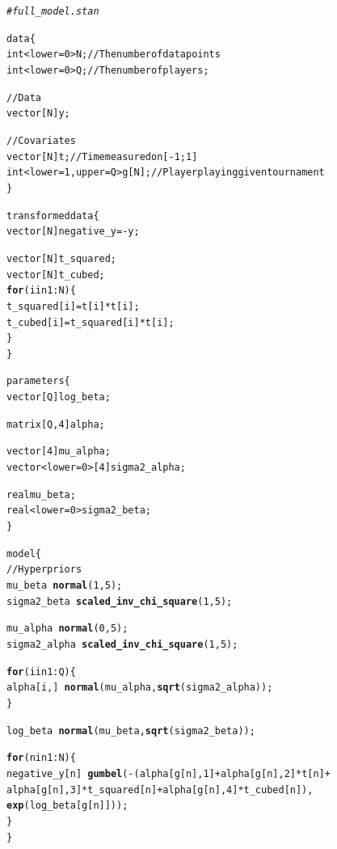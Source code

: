 \documentclass{article}\usepackage[]{graphicx}\usepackage[]{color}
\makeatletter
\newcommand{\hlcom}[1]{\textcolor[rgb]{0.678,0.584,0.686}{\textit{#1}}}%
\newcommand{\hlkwd}[1]{\textcolor[rgb]{0.737,0.353,0.396}{\textbf{#1}}}%
\newenvironment{kframe}{%
 \def\at@end@of@kframe{}%
 \ifinner\ifhmode%
  \def\at@end@of@kframe{\end{minipage}}%
  \begin{minipage}{\columnwidth}%
 \fi\fi%
 \def\FrameCommand##1{\hskip\@totalleftmargin \hskip-\fboxsep
 \colorbox{shadecolor}{##1}\hskip-\fboxsep
     \hskip-\linewidth \hskip-\@totalleftmargin \hskip\columnwidth}%
 \MakeFramed {\advance\hsize-\width
   \@totalleftmargin\z@ \linewidth\hsize
   \@setminipage}}%
 {\par\unskip\endMakeFramed%
 \at@end@of@kframe}
\newenvironment{knitrout}{}{} %
\makeatother
\begin{document}
\begin{knitrout}
\color{fgcolor}\begin{kframe}
\begin{alltt}
\hlcom{# full_model.stan}

data \{
  int<lower=0> N; // The number of data points
  int<lower=0> Q; // The number of players;
  
  //Data 
  vector[N] y;
  
  // Covariates
  vector[N] t; // Time measured on [-1;1]
  int<lower=1, upper=Q> g[N]; // Player playing given tournament
\}

transformed data \{
  vector[N] negative_y = -y;
  
  vector[N] t_squared;
  vector[N] t_cubed;
  \hlkwd{for}(i in 1:N) \{
    t_squared[i] = t[i]*t[i];
    t_cubed[i] = t_squared[i]*t[i];
  \}
\}

parameters \{
  vector[Q] log_beta;
  
  matrix[Q, 4] alpha;
  
  vector[4] mu_alpha;
  vector<lower=0>[4] sigma2_alpha;

  real mu_beta;
  real<lower=0> sigma2_beta;
\}

model \{
  // Hyperpriors
  mu_beta ~ \hlkwd{normal}(1,5);
  sigma2_beta ~ \hlkwd{scaled_inv_chi_square}(1,5);
  
  mu_alpha ~ \hlkwd{normal}(0,5);
  sigma2_alpha ~ \hlkwd{scaled_inv_chi_square}(1,5);
  
  \hlkwd{for}(i in 1:Q) \{
    alpha[i,] ~ \hlkwd{normal}(mu_alpha, \hlkwd{sqrt}(sigma2_alpha));
  \}
  
  log_beta ~ \hlkwd{normal}(mu_beta, \hlkwd{sqrt}(sigma2_beta));
  
  \hlkwd{for}(n in 1:N) \{
    negative_y[n] ~ \hlkwd{gumbel}(-(alpha[g[n],1] + alpha[g[n],2]*t[n] +  
      alpha[g[n],3]*t_squared[n] +  alpha[g[n],4]*t_cubed[n]), 
        \hlkwd{exp}(log_beta[g[n]]));
  \}
\}
\end{alltt}
\end{kframe}
\end{knitrout}
\end{document}
